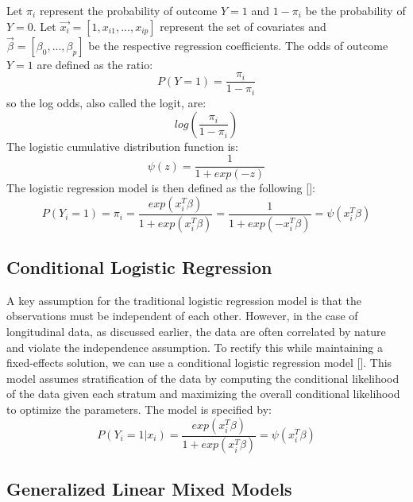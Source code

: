 \documentclass{article}
\begin{document}
    Let $\pi_i$ represent the probability of outcome $Y=1$ and $1-\pi_i$ be the probability of $Y=0$. Let $\vec{x_i} = [1, x_{i1},...,x_{ip}]$ represent the set of covariates and $\vec{\beta} = [\beta_0,...,\beta_p]$ be the respective regression coefficients. The odds of outcome $Y = 1$ are defined as the ratio: \begin{equation}P(Y=1)=\frac{\pi_i}{1-\pi_i}\end{equation}
    so the log odds, also called the logit, are:
    \begin{equation} log\left(\frac{\pi_i}{1-\pi_i}\right) \end{equation} 
    The logistic cumulative distribution function is: \begin{equation}
        \psi(z) = \frac{1}{1+exp(-z)}
    \end{equation} 
    The logistic regression model is then defined as the following [\citealt{gibbons2006longitudinal}]: 
    \begin{equation}
    P(Y_i = 1) = \pi_i = \frac{exp(x_i^T\beta)}{1+exp(x_i^T\beta)} = \frac{1}{1+exp(-x_i^T\beta)} = \psi(x_i^T\beta)
    \end{equation} 

       
    \subsection{Conditional Logistic Regression}
    A key assumption for the traditional logistic regression model is that the observations must be independent of each other. However, in the case of longitudinal data, as discussed earlier, the data are often correlated by nature and violate the independence assumption. To rectify this while maintaining a fixed-effects solution, we can use a conditional logistic regression model [\citealt{agresti2015foundations}]. This model assumes stratification of the data by computing the conditional likelihood of the data given each stratum and maximizing the overall conditional likelihood to optimize the parameters. The model is specified by: 
    \begin{equation}
    P(Y_i = 1 | x_i) = \frac{exp(x_i^T\beta)}{1+exp(x_i^T\beta)} = \psi(x_i^T\beta)
    \end{equation} 
    
    \subsection{Generalized Linear Mixed Models} 
\end{document}
